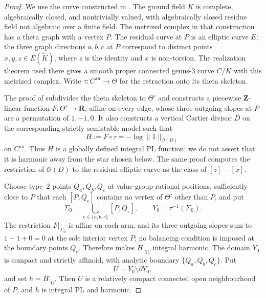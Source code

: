 \begin{proof}
We use the curve constructed in \cite[\S17]{GJR26}.  The ground field $K$ is
complete, algebraically closed, and nontrivially valued, with algebraically
closed residue field not algebraic over a finite field.  The metrized complex
in that construction has a theta graph with a vertex $P$.  The residual
curve at $P$ is an elliptic curve $E$; the three graph directions $a,b,c$ at
$P$ correspond to distinct points $x,y,z\in E(\widetilde K)$, where $z$ is
the identity and $x$ is non-torsion.  The realization theorem used there
gives a smooth proper connected genus-$3$ curve $C/K$ with this metrized
complex.  Write $\tau:C^{\mathrm{an}}\to\Theta$ for the retraction onto its
theta skeleton.

The proof of \cite[Proposition~17.4]{GJR26} subdivides the theta skeleton to
$\Theta'$ and constructs a piecewise $\mathbf Z$-linear function
$F:\Theta'\to\mathbf R$, affine on every edge, whose three outgoing slopes at
$P$ are a permutation of $1,-1,0$.  It also constructs a
vertical Cartier divisor $D$ on the corresponding strictly semistable model
such that
\[
                         H:=F\circ\tau=-\log\lVert1\rVert_{\mathcal O(D)}
\]
on $C^{\mathrm{an}}$.  Thus $H$ is a globally defined integral PL function;
we do not assert that it is harmonic away from the star chosen below.  The
same proof computes the restriction of $\mathcal O(D)$ to the residual
elliptic curve as the class of $[z]-[x]$.

Choose type~$2$ points $Q_a,Q_b,Q_c$ at value-group-rational positions,
sufficiently close to $P$ that each $[P,Q_e]$ contains no vertex of
$\Theta'$ other than $P$, and put
\[
              \Sigma_0=\bigcup_{e\in\{a,b,c\}}[P,Q_e],
              \qquad Y_0=\tau^{-1}(\Sigma_0).
\]
The restriction $F|_{\Sigma_0}$ is affine on each arm, and its three outgoing
slopes sum to $1-1+0=0$ at the sole interior vertex $P$; no balancing
condition is imposed at the boundary points $Q_e$.  Therefore
\cite[Proposition~15.9]{GJR26} makes $H|_{Y_0}$ integral harmonic.  The
domain $Y_0$ is compact and strictly affinoid, with analytic boundary
$\{Q_a,Q_b,Q_c\}$.  Put
\begin{equation}
\label{eq:ch19-harmonic-reg-open-star}
                         U=Y_0\setminus\partial Y_0,
\end{equation}
and set $h=H|_U$.  Then $U$ is a relatively compact connected open
neighbourhood of $P$, and $h$ is integral PL and harmonic.


\end{proof}
